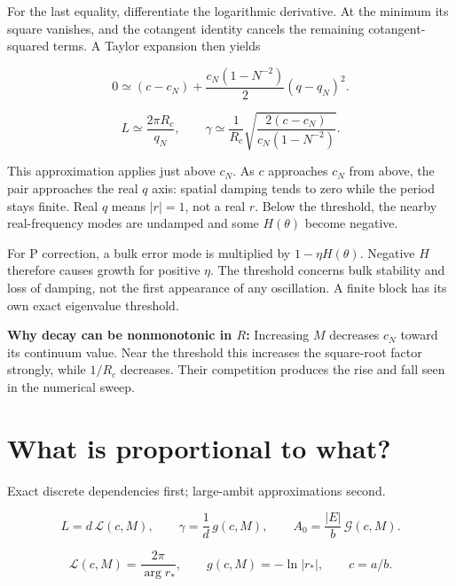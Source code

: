 \documentclass[10pt,a4paper]{article}
\newcommand{\subtitle}[1]{%
  {\small\color{muted}#1\par}\medskip}
\newcommand{\smallnote}[1]{%
  {\small #1\par}}
\begin{document}
For the last equality, differentiate the logarithmic
derivative.
At the minimum its square vanishes, and the
cotangent identity cancels the remaining
cotangent-squared terms.
A Taylor expansion then yields

\begin{equation}
0
\simeq
(c-c_N)
+
\frac{c_N(1-N^{-2})}{2}(q-q_N)^2.
\end{equation}

\begin{equation}
\boxed{
L\simeq\frac{2\pi R_c}{q_N},
\qquad
\gamma\simeq
\frac{1}{R_c}
\sqrt{
\frac{2(c-c_N)}
     {c_N(1-N^{-2})}
}.
}
\end{equation}

This approximation applies just above $c_N$.
As $c$ approaches $c_N$ from above, the pair
approaches the real $q$ axis:
spatial damping tends to zero while the period
stays finite.
Real $q$ means $|r|=1$, not a real $r$.
Below the threshold, the nearby real-frequency
modes are undamped and some $H(\theta)$
become negative.

\smallnote{
For P correction, a bulk error mode is multiplied
by $1-\eta H(\theta)$.
Negative $H$ therefore causes growth for positive
$\eta$.
The threshold concerns bulk stability and loss
of damping, not the first appearance of any
oscillation.
A finite block has its own exact eigenvalue threshold.
}

\smallnote{
\textbf{Why decay can be nonmonotonic in $R$:}
Increasing $M$ decreases $c_N$ toward its continuum
value.
Near the threshold this increases the square-root
factor strongly, while $1/R_c$ decreases.
Their competition produces the rise and fall
seen in the numerical sweep.
}

\clearpage
\section{What is proportional to what?}
\subtitle{Exact discrete dependencies first;
large-ambit approximations second.}

\begin{equation}
L=d\,\mathcal L(c,M),
\qquad
\gamma=\frac{1}{d}\,g(c,M),
\qquad
A_0=\frac{|E|}{b}\,\mathcal G(c,M).
\end{equation}

\begin{equation}
\mathcal L(c,M)
=
\frac{2\pi}{\arg r_*},
\qquad
g(c,M)=-\ln|r_*|,
\qquad
c=a/b.
\end{equation}
\end{document}
